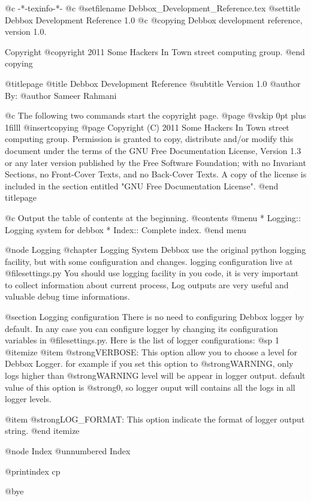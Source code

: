    @c -*-texinfo-*-
@c %
@setfilename Debbox_Development_Reference.tex
@settitle Debbox Development Reference 1.0
@c %
@copying
Debbox development reference, version 1.0.

Copyright @copyright{} 2011 Some Hackers In Town street computing group.
@end copying

@titlepage
@title Debbox Development Reference
@subtitle Version 1.0
@author By:
@author Sameer Rahmani

@c The following two commands start the copyright page.
@page
@vskip 0pt plus 1filll
@insertcopying
@page
Copyright (C)  2011  Some Hackers In Town street computing group.
Permission is granted to copy, distribute and/or modify this document
under the terms of the GNU Free Documentation License, Version 1.3
or any later version published by the Free Software Foundation;
with no Invariant Sections, no Front-Cover Texts, and no Back-Cover Texts.
A copy of the license is included in the section entitled "GNU
Free Documentation License".
@end titlepage

@c Output the table of contents at the beginning.
@contents
@menu
* Logging::     Logging system for debbox
* Index::            Complete index.
@end menu

@node Logging
@chapter Logging System
Debbox use the original python logging facility, but with some configuration and changes. logging configuration live at @file{settings.py}
You should use logging facility in you code, it is very important to collect information about current process, Log outputs are very useful and
valuable debug time informations.

@section Logging configuration
There is no need to configuring Debbox logger by default. In any case you can configure logger by changing its configuration variables in 
@file{settings.py}. Here is the list of logger configurations:
@sp 1
@itemize
@item
@strong{VERBOSE}: This option allow you to choose a level for Debbox Logger. for example if you set this option to @strong{WARNING}, only logs 
higher than @strong{WARNING} level will be appear in logger output. default value of this option is @strong{0}, so logger ouput will contains all the logs in all logger levels.

@item
@strong{LOG_FORMAT}: This option indicate the format of logger output string.
@end itemize

@node Index
@unnumbered Index

@printindex cp

@bye
